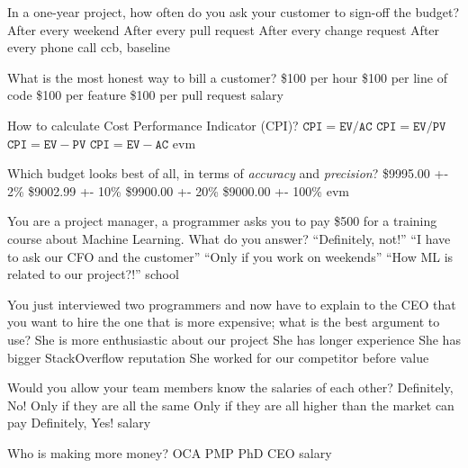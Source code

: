 \documentclass{article}
\begin{document}

\pmbaQuestion
  {In a one-year project, how often do you ask your customer to sign-off the budget?}
  {After every weekend}
  {After every pull request}
  {After every change request}
  {After every phone call}
  {ccb, baseline}

\pmbaQuestion
  {What is the most honest way to bill a customer?}
  {\$100 per hour}
  {\$100 per line of code}
  {\$100 per feature}
  {\$100 per pull request}
  {salary}

\pmbaQuestion
  {How to calculate Cost Performance Indicator (CPI)?}
  {\(\texttt{CPI} = \texttt{EV} / \texttt{AC}\)} %
  {\(\texttt{CPI} = \texttt{EV} / \texttt{PV}\)} %
  {\(\texttt{CPI} = \texttt{EV} - \texttt{PV}\)} %
  {\(\texttt{CPI} = \texttt{EV} - \texttt{AC}\)} %
  {evm}

\pmbaQuestion
  {Which budget looks best of all, in terms of \emph{accuracy} and \emph{precision}?}
  {\$9995.00 +- 2\%}
  {\$9002.99 +- 10\%}
  {\$9900.00 +- 20\%}
  {\$9000.00 +- 100\%}
  {evm}

\pmbaQuestion
  {You are a project manager, a programmer asks you to pay \$500 for a training course about Machine Learning. What do you answer?}
  {``Definitely, not!''}
  {``I have to ask our CFO and the customer''}
  {``Only if you work on weekends''}
  {``How ML is related to our project?!''}
  {school}

\pmbaQuestion
  {You just interviewed two programmers and now have to explain to the CEO that you want to hire the one that is more expensive; what is the best argument to use?}
  {She is more enthusiastic about our project}
  {She has longer experience}
  {She has bigger StackOverflow reputation}
  {She worked for our competitor before}
  {value}

\pmbaQuestion
  {Would you allow your team members know the salaries of each other?}
  {Definitely, No!}
  {Only if they are all the same}
  {Only if they are all higher than the market can pay}
  {Definitely, Yes!}
  {salary}

\pmbaQuestion
  {Who is making more money?}
  {OCA}
  {PMP}
  {PhD}
  {CEO}
  {salary}


\end{document}
